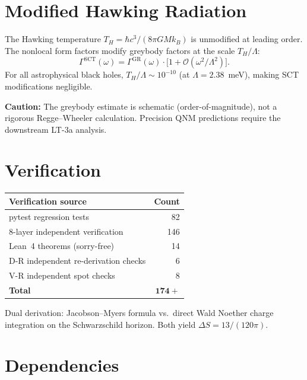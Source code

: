 \documentclass[11pt,a4paper]{article}
\begin{document}
\section{Modified Hawking Radiation}

The Hawking temperature $T_H = \hbar c^3/(8\pi G M k_B)$ is unmodified at leading
order. The nonlocal form factors modify greybody factors at the scale $T_H/\Lambda$:
\[
  \Gamma^{\mathrm{SCT}}(\omega) = \Gamma^{\mathrm{GR}}(\omega)\cdot\bigl[1 + \mathcal{O}(\omega^2/\Lambda^2)\bigr].
\]
For all astrophysical black holes, $T_H/\Lambda \sim 10^{-10}$ (at $\Lambda = 2.38$~meV),
making SCT modifications negligible.

\textbf{Caution:} The greybody estimate is schematic (order-of-magnitude),
not a rigorous Regge--Wheeler calculation. Precision QNM predictions require
the downstream LT-3a analysis.

\section{Verification}

\begin{center}
\begin{tabular}{lr}
\toprule
\textbf{Verification source} & \textbf{Count} \\
\midrule
pytest regression tests & 82 \\
8-layer independent verification & 146 \\
Lean~4 theorems (sorry-free) & 14 \\
D-R independent re-derivation checks & 6 \\
V-R independent spot checks & 8 \\
\midrule
\textbf{Total} & $\mathbf{174+}$ \\
\bottomrule
\end{tabular}
\end{center}

Dual derivation: Jacobson--Myers formula vs.\ direct Wald Noether charge
integration on the Schwarzschild horizon. Both yield $\Delta S = 13/(120\pi)$.

\section{Dependencies}
\end{document}
